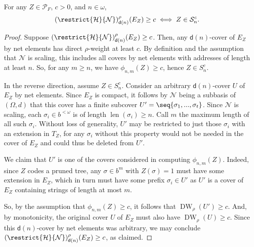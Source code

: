 \begin{lemma}
    \label{lemma:Hausdorff_measure_characterization_of_S_c_n}
    For any $Z \in \mathcal{P}_F$, $c > 0$, and $n \in \omega$,
    \begin{align*}
        (\restrict{\mathcal{H}}{\mathcal{N}})^\rho_{\mathsf{d}(n)}(E_Z) \geq c \iff Z \in \mathcal{S}^c_n.
    \end{align*}
\end{lemma}
\begin{proof}
    Suppose $(\restrict{\mathcal{H}}{\mathcal{N}})^\rho_{\mathsf{d}(n)}(E_Z) \geq c$. Then, any $\mathsf{d}(n)$-cover of $E_Z$ by net elements has direct $\rho$-weight at least $c$. By definition and the assumption that $\mathcal{N}$ is scaling, this includes all covers by net elements with addresses of length at least $n$. So, for any $m \geq n$, we have $\phi_{n, m}(Z) \geq c$, hence $Z \in S^c_n$. 

    In the reverse direction, assume $Z \in S^c_n$. Consider an arbitrary $\mathsf{d}(n)$-cover $U$ of $E_Z$ by net elements. Since $E_Z$ is compact, it follows by $\mathcal{N}$ being a subbasis of $(\Omega, d)$ that
    this cover has a finite subcover $U' = \seq{\sigma_1, ..., \sigma_t }$. 
    Since $\mathcal{N}$ is scaling, each $\sigma_i \in b^{<\omega}$ is of length $\operatorname{len}(\sigma_i) \geq n$. Call $m$ the maximum length of all such $\sigma_i$. Without loss of generality, $U'$ may be restricted to just those $\sigma_i$ with an extension in $T_Z$, for any $\sigma_i$ without this property would not be needed in the cover of $E_Z$ and could thus be deleted from $U'$. 
    
    We claim that $U'$ is one of the covers considered in computing $\phi_{n, m}(Z)$. Indeed, since $Z$ codes a pruned tree, any $\sigma \in b^m$ with $Z(\sigma) = 1$ must have some extension in $E_Z$, which in turn must have some prefix $\sigma_i \in U'$ as $U'$ is a cover of $E_Z$ containing strings of length at most $m$. 
    
    So, by the assumption that $\phi_{n, m}(Z) \geq c$, it follows that $\operatorname{DW}_\rho(U') \geq c$. And, by monotonicity, the original cover $U$ of $E_Z$ must also have $\operatorname{DW}_\rho(U) \geq c$. Since this $\mathsf{d}(n)$-cover by net elements was arbitrary, we may conclude $(\restrict{\mathcal{H}}{\mathcal{N}})^\rho_{\mathsf{d}(n)}(E_Z) \geq c$, as claimed.
\end{proof}
    
